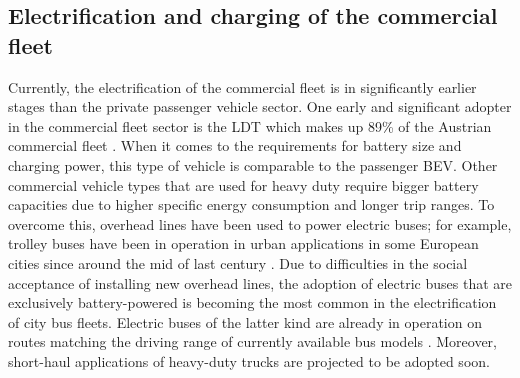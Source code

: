 \documentclass[final,10pt]{elsarticle}
\begin{document}
    \subsection{Electrification and charging of the commercial fleet}
        Currently, the electrification of the commercial fleet is in significantly earlier stages than the private passenger vehicle sector. One early and significant adopter in the commercial fleet sector is the \ac{LDT} which makes up 89\% of the Austrian commercial fleet \cite{statistik_at_kfz_bestand}. When it comes to the requirements for battery size and charging power, this type of vehicle is comparable to the passenger \ac{BEV}. Other commercial vehicle types that are used for heavy duty require bigger battery capacities due to higher specific energy consumption and longer trip ranges. To overcome this, overhead lines have been used to power electric buses; for example, trolley buses have been in operation in urban applications in some European cities since around the mid of last century \cite{ietmeishner}. Due to difficulties in the social acceptance of installing new overhead lines, the adoption of electric buses that are exclusively battery-powered is becoming the most common in the electrification of city bus fleets.  Electric buses of the latter kind are already in operation on routes matching the driving range of currently available bus models \cite{orf2023}. Moreover, short-haul applications of heavy-duty trucks are projected to be adopted soon\cite{NOLL2022118079}. 
\end{document}
